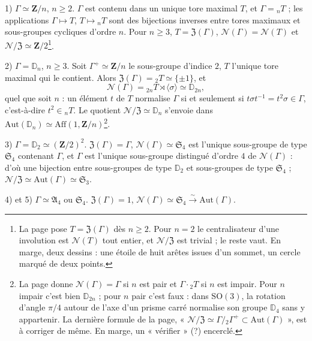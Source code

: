 \documentclass[11pt,a4paper]{article}
\begin{document}
1) $\Gamma \simeq \mathbf{Z}/n$, $n \geq 2$. $\Gamma$ est contenu dans un
unique tore maximal $T$, et $\Gamma = {}_nT$ ; les applications $\Gamma
\mapsto T$, $T \mapsto {}_nT$ sont des bijections inverses entre tores
maximaux et sous-groupes cycliques d'ordre $n$. Pour $n \geq 3$, $T =
\mathfrak{Z}(\Gamma)$, $\mathcal{N}(\Gamma) = \mathcal{N}(T)$ et
$\mathcal{N}/\mathfrak{Z} \simeq \mathbf{Z}/2$\footnote{La page pose $T =
\mathfrak{Z}(\Gamma)$ dès $n \geq 2$. Pour $n = 2$ le centralisateur d'une
involution est $\mathcal{N}(T)$ tout entier, et $\mathcal{N}/\mathfrak{Z}$
est trivial ; le reste vaut. En marge, deux dessins : une étoile de huit
arêtes issues d'un sommet, un cercle marqué de deux points.}.

2) $\Gamma = \mathbb{D}_n$, $n \geq 3$. Soit $\Gamma^+ \simeq \mathbf{Z}/n$
le sous-groupe d'indice $2$, $T$ l'unique tore maximal qui le contient. Alors
$\mathfrak{Z}(\Gamma) = {}_2T \simeq \{\pm 1\}$, et
\[
  \mathcal{N}(\Gamma) = {}_{2n}T \rtimes \langle\sigma\rangle \simeq
  \mathbb{D}_{2n} ,
\]
quel que soit $n$ : un élément $t$ de $T$ normalise $\Gamma$ si et seulement si
$t\sigma t^{-1} = t^2\sigma \in \Gamma$, c'est-à-dire $t^2 \in {}_nT$. Le
quotient $\mathcal{N}/\mathfrak{Z} \simeq \mathbb{D}_n$ s'envoie dans
$\mathrm{Aut}(\mathbb{D}_n) \simeq \mathrm{Aff}(1, \mathbf{Z}/n)$\footnote{La
page donne $\mathcal{N}(\Gamma) = \Gamma$ si $n$ est pair et $\Gamma \cdot
{}_2T$ si $n$ est impair. Pour $n$ impair c'est bien $\mathbb{D}_{2n}$ ; pour
$n$ pair c'est faux : dans $\mathrm{SO}(3)$, la rotation d'angle $\pi/4$ autour
de l'axe d'un prisme carré normalise son groupe $\mathbb{D}_4$ sans y
appartenir. La dernière formule de la page, « $\mathcal{N}/\mathfrak{Z} \simeq
\Gamma/{}_2\Gamma^+ \subset \mathrm{Aut}(\Gamma)$ », est à corriger de même.
En marge, un « vérifier » (?) encerclé.}.

3) $\Gamma = \mathbb{D}_2 \simeq (\mathbf{Z}/2)^2$. $\mathfrak{Z}(\Gamma) =
\Gamma$, $\mathcal{N}(\Gamma) \simeq \mathfrak{S}_4$ est l'unique sous-groupe
de type $\mathfrak{S}_4$ contenant $\Gamma$, et $\Gamma$ est l'unique
sous-groupe distingué d'ordre $4$ de $\mathcal{N}(\Gamma)$ : d'où une
bijection entre sous-groupes de type $\mathbb{D}_2$ et sous-groupes de type
$\mathfrak{S}_4$ ; $\mathcal{N}/\mathfrak{Z} \simeq \mathrm{Aut}(\Gamma)
\simeq \mathfrak{S}_3$.

4) et 5) $\Gamma \simeq \mathfrak{A}_4$ ou $\mathfrak{S}_4$.
$\mathfrak{Z}(\Gamma) = 1$, $\mathcal{N}(\Gamma) \simeq \mathfrak{S}_4
\xrightarrow{\sim} \mathrm{Aut}(\Gamma)$.
\end{document}
